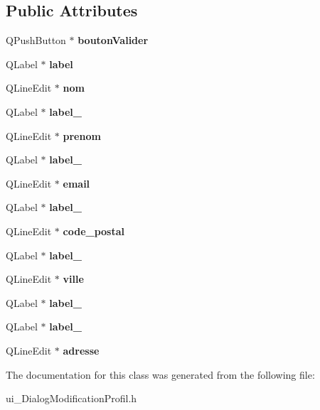 \subsection*{Public Attributes}
\begin{DoxyCompactItemize}
\item 
Q\-Push\-Button $\ast$ {\bfseries bouton\-Valider}\label{class_ui___dialog_modification_profil_af20fdf74b0575d4e4a83b3fdd78b773d}

\item 
Q\-Label $\ast$ {\bfseries label}\label{class_ui___dialog_modification_profil_af0cd677e0f1af8ec6649d590537448a0}

\item 
Q\-Line\-Edit $\ast$ {\bfseries nom}\label{class_ui___dialog_modification_profil_ae95b8fd825c2d092eecd5fdcc83d5213}

\item 
Q\-Label $\ast$ {\bfseries label\-\_}\label{class_ui___dialog_modification_profil_abcab2110522286dcc6f1abcfb8df3032}

\item 
Q\-Line\-Edit $\ast$ {\bfseries prenom}\label{class_ui___dialog_modification_profil_a34af0438ab4d51c5a1cbd3171ca56fbf}

\item 
Q\-Label $\ast$ {\bfseries label\-\_}\label{class_ui___dialog_modification_profil_ae641346202559988ff45516a4ba78e90}

\item 
Q\-Line\-Edit $\ast$ {\bfseries email}\label{class_ui___dialog_modification_profil_a8031c71ba4f8adc3d82bc08d73190f53}

\item 
Q\-Label $\ast$ {\bfseries label\-\_}\label{class_ui___dialog_modification_profil_ab4a50f6eb1a12c3960b9482bd236a97c}

\item 
Q\-Line\-Edit $\ast$ {\bfseries code\-\_\-postal}\label{class_ui___dialog_modification_profil_a93b6c690c6707d373fc814a119821546}

\item 
Q\-Label $\ast$ {\bfseries label\-\_}\label{class_ui___dialog_modification_profil_a29db887be1dec97eee38c3a93a765772}

\item 
Q\-Line\-Edit $\ast$ {\bfseries ville}\label{class_ui___dialog_modification_profil_a1c6d48ece9604745e80462ef426ac0ea}

\item 
Q\-Label $\ast$ {\bfseries label\-\_}\label{class_ui___dialog_modification_profil_a65181d9deaa1b933282b99de2d7240f7}

\item 
Q\-Label $\ast$ {\bfseries label\-\_}\label{class_ui___dialog_modification_profil_a04a21015743a0eb5881251fa68c959fa}

\item 
Q\-Line\-Edit $\ast$ {\bfseries adresse}\label{class_ui___dialog_modification_profil_abd307db23d2f04b3a0e4a596cdbe8656}

\end{DoxyCompactItemize}


The documentation for this class was generated from the following file\-:\begin{DoxyCompactItemize}
\item 
ui\-\_\-\-Dialog\-Modification\-Profil.\-h\end{DoxyCompactItemize}
